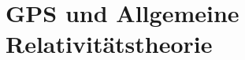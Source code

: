 \chapter{GPS und Allgemeine Relativitätstheorie\label{chapter:thema}}
\begin{refsection}

\printbibliography[heading=subbibliography]
\end{refsection}

